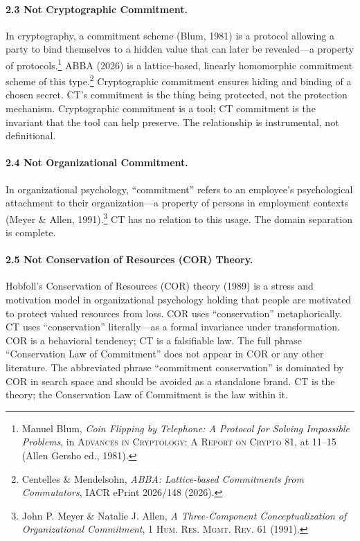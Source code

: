 \documentclass[11pt,a4paper]{article}
\begin{document}
\paragraph{2.3 Not Cryptographic Commitment.}
In cryptography, a commitment scheme (Blum, 1981) is a protocol allowing a party to bind themselves to a hidden value that can later be revealed---a property of protocols.\footnote{Manuel Blum, \textit{Coin Flipping by Telephone: A Protocol for Solving Impossible Problems}, in \textsc{Advances in Cryptology: A Report on Crypto 81}, at 11--15 (Allen Gersho ed., 1981).} ABBA (2026) is a lattice-based, linearly homomorphic commitment scheme of this type.\footnote{Centelles \& Mendelsohn, \textit{ABBA: Lattice-based Commitments from Commutators}, IACR ePrint 2026/148 (2026).} Cryptographic commitment ensures hiding and binding of a chosen secret. CT's commitment is the thing being protected, not the protection mechanism. Cryptographic commitment is a tool; CT commitment is the invariant that the tool can help preserve. The relationship is instrumental, not definitional.

\paragraph{2.4 Not Organizational Commitment.}
In organizational psychology, ``commitment'' refers to an employee's psychological attachment to their organization---a property of persons in employment contexts (Meyer \& Allen, 1991).\footnote{John P. Meyer \& Natalie J. Allen, \textit{A Three-Component Conceptualization of Organizational Commitment}, 1 \textsc{Hum. Res. Mgmt. Rev.} 61 (1991).} CT has no relation to this usage. The domain separation is complete.

\paragraph{2.5 Not Conservation of Resources (COR) Theory.}
Hobfoll's Conservation of Resources (COR) theory (1989) is a stress and motivation model in organizational psychology holding that people are motivated to protect valued resources from loss. COR uses ``conservation'' metaphorically. CT uses ``conservation'' literally---as a formal invariance under transformation. COR is a behavioral tendency; CT is a falsifiable law. The full phrase ``Conservation Law of Commitment'' does not appear in COR or any other literature. The abbreviated phrase ``commitment conservation'' is dominated by COR in search space and should be avoided as a standalone brand. CT is the theory; the Conservation Law of Commitment is the law within it.
\end{document}
